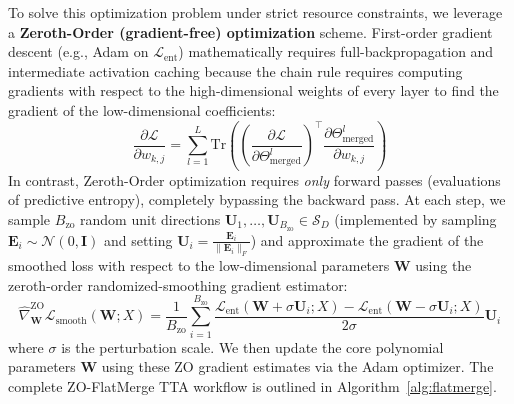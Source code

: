 To solve this optimization problem under strict resource constraints, we leverage a \textbf{Zeroth-Order (gradient-free) optimization} scheme. First-order gradient descent (e.g., Adam on $\mathcal{L}_{\text{ent}}$) mathematically requires full-backpropagation and intermediate activation caching because the chain rule requires computing gradients with respect to the high-dimensional weights of every layer to find the gradient of the low-dimensional coefficients:
\begin{equation}
    \frac{\partial \mathcal{L}}{\partial w_{k, j}} = \sum_{l=1}^L \text{Tr}\left( \left(\frac{\partial \mathcal{L}}{\partial \Theta^l_{\text{merged}}}\right)^\top \frac{\partial \Theta^l_{\text{merged}}}{\partial w_{k, j}} \right)
\end{equation}
In contrast, Zeroth-Order optimization requires \emph{only} forward passes (evaluations of predictive entropy), completely bypassing the backward pass. At each step, we sample $B_{\text{zo}}$ random unit directions $\mathbf{U}_1, \dots, \mathbf{U}_{B_{\text{zo}}} \in \mathcal{S}_D$ (implemented by sampling $\mathbf{E}_i \sim \mathcal{N}(0, \mathbf{I})$ and setting $\mathbf{U}_i = \frac{\mathbf{E}_i}{\|\mathbf{E}_i\|_F}$) and approximate the gradient of the smoothed loss with respect to the low-dimensional parameters $\mathbf{W}$ using the zeroth-order randomized-smoothing gradient estimator:
\begin{equation}
    \hat{\nabla}_{\mathbf{W}}^{\text{ZO}} \mathcal{L}_{\text{smooth}}(\mathbf{W}; X) = \frac{1}{B_{\text{zo}}} \sum_{i=1}^{B_{\text{zo}}} \frac{\mathcal{L}_{\text{ent}}(\mathbf{W} + \sigma \mathbf{U}_i; X) - \mathcal{L}_{\text{ent}}(\mathbf{W} - \sigma \mathbf{U}_i; X)}{2 \sigma} \mathbf{U}_i
\end{equation}
where $\sigma$ is the perturbation scale. We then update the core polynomial parameters $\mathbf{W}$ using these ZO gradient estimates via the Adam optimizer. The complete ZO-FlatMerge TTA workflow is outlined in Algorithm~\ref{alg:flatmerge}.

